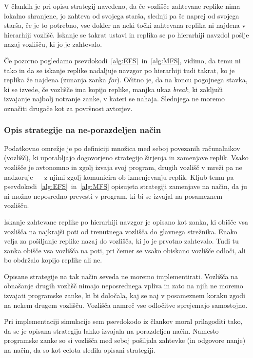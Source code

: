 \documentclass[a4paper, 12pt]{book}
\begin{document}
V člankih je pri opisu strategij navedeno, da če vozlišče zahtevane replike
nima lokalno shranjene, jo zahteva od svojega starša, slednji pa še naprej
od svojega starša, če je to potrebno, vse dokler na neki točki zahtevana
replika ni najdena v hierarhiji vozlišč. Iskanje se takrat ustavi in replika
se po hierarhiji navzdol pošlje nazaj vozlišču, ki jo je zahtevalo.

Če pozorno pogledamo psevdokodi~\ref{alg:EFS}~in~\ref{alg:MFS}, vidimo, da temu
ni tako in da se iskanje replike nadaljuje navzgor po hierarhiji tudi takrat,
ko je replika že najdena (zunanja zanka \textit{for}). Očitno je, da na koncu
pogojnega stavka, ki se izvede, če vozlišče ima kopijo replike, manjka ukaz
\textit{break}, ki zaključi izvajanje najbolj notranje zanke, v kateri se
nahaja. Slednjega ne moremo označiti drugače kot za površnost avtorjev.

\subsubsection{Opis strategije na ne-porazdeljen način}

Podatkovno omrežje je po definiciji množica med seboj povezanih računal\-nikov
(vozlišč), ki uporabljajo dogovorjeno strategijo širjenja in zamenjave replik.
Vsako vozlišče je avtonomno in zgolj izvaja svoj program, drugih vozlišč v
mreži pa ne nadzoruje --- z njimi zgolj komunicira ob izmenjevanju
replik. Kljub temu pa psevdokodi~\ref{alg:EFS}~in~\ref{alg:MFS}
opisujeta strategiji zamenjave na način, da ju ni možno neposredno prevesti v
program, ki bi se izvajal na posameznem vozlišču.

Iskanje zahtevane replike po hierarhiji navzgor je opisano kot zanka, ki obišče
vsa vozlišča na najkrajši poti od trenutnega vozlišča do glavnega strežnika.
Enako velja za pošiljanje replike nazaj do vozlišča, ki jo je prvotno
zahtevalo.
Tudi tu zanka obišče vsa vozlišča na poti, pri čemer se vsako obiskano vozlišče
odloči, ali bo obdržalo kopijo replike ali ne.

Opisane strategije na tak način seveda ne moremo implementirati. Vozlišča na
obnašanje drugih vozlišč nimajo neposrednega vpliva in zato na njih ne moremo
izvajati programske zanke, ki bi določala, kaj se naj v posameznem koraku zgodi
na nekem drugem vozlišču. Vozlišča namreč vse odločitve sprejemajo samostojno.

Pri implementaciji simulacije sem psevdokodo iz člankov moral prilagoditi tako,
da se je opisana strategija lahko izvajala na porazdeljen način. Namesto
programske zanke so si vozlišča med seboj pošiljala zahtevke (in odgovore
nanje) na način, da so kot celota sledila opisani strategiji.
\end{document}
